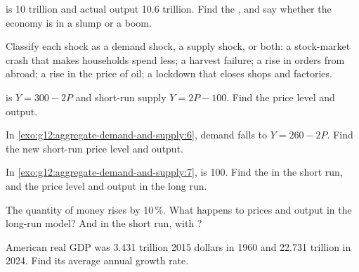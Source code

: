 \begin{exercise}[$\star$]\label{exo:g12:aggregate-demand-and-supply:4}
 is 10 trillion and actual output 10.6 trillion. Find the , and say whether the economy is in a slump or a boom.
\end{exercise}

\begin{exercise}[$\star$]\label{exo:g12:aggregate-demand-and-supply:5}
Classify each shock as a demand shock, a supply shock, or both: a stock-market crash that makes households spend less; a harvest failure; a rise in orders from abroad;
a rise in the price of oil; a lockdown that closes shops and factories.
\end{exercise}

\begin{exercise}[$\star\star$]\label{exo:g12:aggregate-demand-and-supply:6}
 is $Y = 300 - 2P$ and short-run supply $Y = 2P - 100$. Find the price level and output.
\end{exercise}

\begin{exercise}[$\star\star$]\label{exo:g12:aggregate-demand-and-supply:7}
In \cref{exo:g12:aggregate-demand-and-supply:6}, demand falls to $Y = 260 - 2P$. Find the new short-run price level and output.
\end{exercise}

\begin{exercise}[$\star\star$]\label{exo:g12:aggregate-demand-and-supply:8}
In \cref{exo:g12:aggregate-demand-and-supply:7},  is 100. Find the  in the short run, and the price level and output in the long run.
\end{exercise}

\begin{exercise}[$\star\star$]\label{exo:g12:aggregate-demand-and-supply:9}
The quantity of money rises by 10\,\%. What happens to prices and output in the long-run model? And in the short run, with ?
\end{exercise}

\begin{exercise}[$\star\star$]\label{exo:g12:aggregate-demand-and-supply:10}
American real GDP was 3.431 trillion 2015 dollars in 1960 and 22.731 trillion in 2024. Find its average annual growth rate.
\end{exercise}

